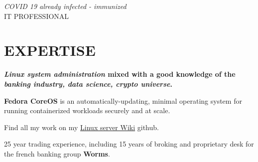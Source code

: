 


\color{myblue}
\makecvtitle
\begin{center}
\vspace{-1.4cm}

\vspace{0.5cm}
\textit{COVID 19 already infected - immunized}\\
\vspace{0.2cm}
\Large{\textsc{IT PROFESSIONAL}}
\end{center}


\section{EXPERTISE}
\cventry{}{}{}{}{}{}{}
\vspace{-1cm}


\textbf{\textit{Linux system administration} mixed with a good knowledge of the \textit{banking industry, data science, crypto universe}.}

\vspace{\baselineskip}

\textbf{Fedora CoreOS} is an automatically-updating, minimal operating system for running containerized workloads securely and at scale.

Find all my work on my \href{https://github.com/gabx/thetradinghall/wiki}{Linux server Wiki} github.

\vspace{\baselineskip}
\vspace{-0.5cm}

25 year trading experience, including 15 years of broking and proprietary desk for the french banking group \textbf{Worms}.

\vspace{\baselineskip}
\vspace{-0.5cm}

